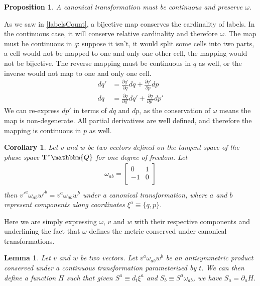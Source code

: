 \documentclass[aps,pra,10pt,twocolumn,floatfix,nofootinbib]{revtex4-1}
\newtheorem{cor}[thm]{Corollary}
\newtheorem{lem}[thm]{Lemma}
\newtheorem{prop}[thm]{Proposition}
\theoremstyle{definition}
\begin{document}
\begin{prop}\label{continuousMapping}
A canonical transformation must be continuous and preserve $\omega$.
\end{prop}

As we saw in \ref{labelsCount}, a bijective map conserves the cardinality of labels. In the continuous case, it will conserve relative cardinality and therefore $\omega$. The map must be continuous in $q$: suppose it isn't, it would split some cells into two parts, a cell would not be mapped to one and only one other cell, the mapping would not be bijective. The reverse mapping must be continuous in $q$ as well, or the inverse would not map to one and only one cell.
\begin{align*}
dq' &= \frac{\partial q'}{\partial q} dq + \frac{\partial q'}{\partial p} dp \\
dq &= \frac{\partial q}{\partial q'} dq' + \frac{\partial q}{\partial p'} dp'
\end{align*}
We can re-express $dp'$ in terms of $dq$ and $dp$, as the conservation of $\omega$ means the map is non-degenerate. All partial derivatives are well defined, and therefore the mapping is continuous in $p$ as well.

\begin{cor}\label{sdofInvariant}
Let $v$ and $w$ be two vectors defined on the tangent space of the phase space $\mathbf{T}^*\mathbbm{Q}$ for one degree of freedom. Let
\begin{align*}
\omega_{ab} = \left[
  \begin{array}{cc}
    0 & 1 \\
    -1 & 0 \\
  \end{array}
\right] \\
\end{align*}
then $v'^{a} \omega_{ab} w'^{b}=v^{a} \omega_{ab} w^{b}$ under a canonical transformation, where $a$ and $b$ represent components along coordinates $\xi^{a} \equiv \{q,p\}$.
\end{cor}

Here we are simply expressing $\omega$, $v$ and $w$ with their respective components and underlining the fact that $\omega$ defines the metric conserved under canonical transformations.

\begin{lem}\label{genAntisim}
Let $v$ and $w$ be two vectors. Let $v^{a} \omega_{ab} w^{b}$ be an antisymmetric product conserved under a continuous transformation parameterized by $t$. We can then define a function $H$ such that given $S^{a} \equiv d_{t}\xi^{a}$ and $S_{b} \equiv S^{a} \omega_{ab}$, we have $S_{a} = \partial_{a}H$.
\end{lem}
\end{document}
